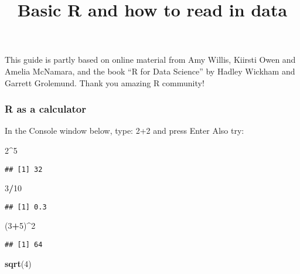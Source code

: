 \documentclass[
]{article}
\title{Basic R and how to read in data}
\author{}
\date{\vspace{-2.5em}}
\newenvironment{Shaded}{\begin{snugshade}}{\end{snugshade}}
\newcommand{\DecValTok}[1]{\textcolor[rgb]{0.00,0.00,0.81}{#1}}
\newcommand{\FunctionTok}[1]{\textcolor[rgb]{0.13,0.29,0.53}{\textbf{#1}}}
\newcommand{\NormalTok}[1]{#1}
\newcommand{\SpecialCharTok}[1]{\textcolor[rgb]{0.81,0.36,0.00}{\textbf{#1}}}
\begin{document}
\maketitle

This guide is partly based on online material from Amy Willis, Kiirsti
Owen and Amelia McNamara, and the book ``R for Data Science'' by Hadley
Wickham and Garrett Grolemund. Thank you amazing R community!

\subsubsection{R as a calculator}\label{r-as-a-calculator}

In the Console window below, type: 2+2 and press Enter Also try:

\begin{Shaded}
\begin{Highlighting}[]
\DecValTok{2}\SpecialCharTok{\^{}}\DecValTok{5}
\end{Highlighting}
\end{Shaded}

\begin{verbatim}
## [1] 32
\end{verbatim}

\begin{Shaded}
\begin{Highlighting}[]
\DecValTok{3}\SpecialCharTok{/}\DecValTok{10}
\end{Highlighting}
\end{Shaded}

\begin{verbatim}
## [1] 0.3
\end{verbatim}

\begin{Shaded}
\begin{Highlighting}[]
\NormalTok{(}\DecValTok{3}\SpecialCharTok{+}\DecValTok{5}\NormalTok{)}\SpecialCharTok{\^{}}\DecValTok{2}
\end{Highlighting}
\end{Shaded}

\begin{verbatim}
## [1] 64
\end{verbatim}

\begin{Shaded}
\begin{Highlighting}[]
\FunctionTok{sqrt}\NormalTok{(}\DecValTok{4}\NormalTok{)}
\end{Highlighting}
\end{Shaded}
\end{document}
